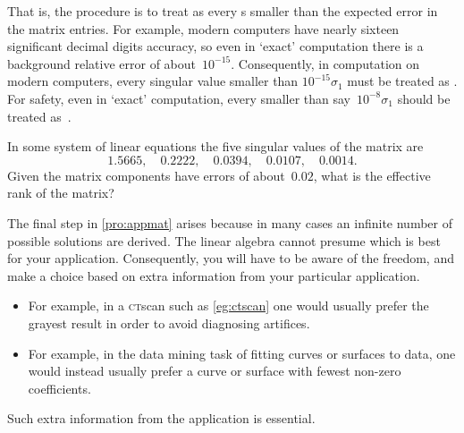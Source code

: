 That is, the procedure is to treat as  every s smaller than the expected error in the matrix entries.
For example, modern computers have nearly sixteen significant decimal digits accuracy, so even in `exact' computation there is a background relative error of about~\(10^{-15}\).
Consequently, in computation on modern computers, every singular value smaller than \(10^{-15}\sigma_1\) must be treated as .
For safety, even in `exact' computation, every  smaller than say~\(10^{-8}\sigma_1\) should be treated as~.


\begin{activity}
In some system of linear equations the five singular values of the matrix are
\begin{equation*}
1.5665,\quad
0.2222,\quad
0.0394,\quad
0.0107,\quad
0.0014.
\end{equation*}
Given the matrix components have errors of about~\(0.02\), what is the effective rank of the matrix?
\end{activity}

The final step in \autoref{pro:appmat} arises because in many cases an infinite number of possible solutions are derived.
The linear algebra cannot presume which is best for your application.
Consequently, you will have to be aware of the freedom, and make a choice based on extra information from your particular application.
\begin{itemize}
\item For example, in a \textsc{ct}scan such as \autoref{eg:ctscan} one would usually prefer the grayest result in order to avoid diagnosing artifices.
\item For example, in the data mining task of fitting curves or surfaces to data, one would instead usually prefer a curve or surface with fewest non-zero coefficients.
\end{itemize}
Such extra information from the application is essential. 





